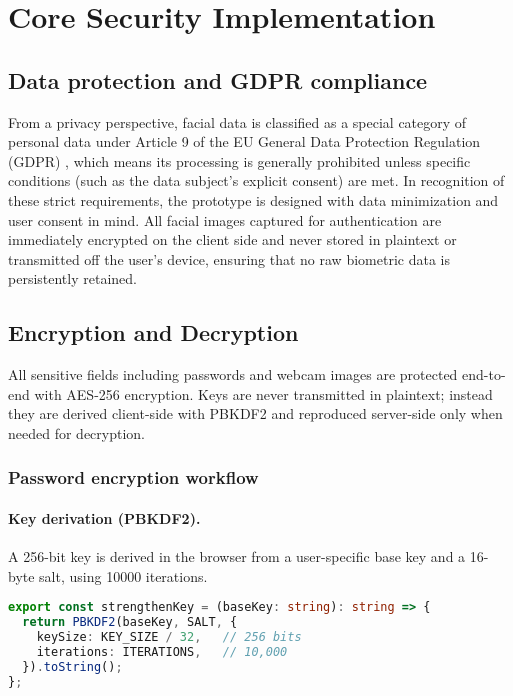 \section{Core Security Implementation}

\subsection{Data protection and GDPR compliance}
From a privacy perspective, facial data is classified as a special category of personal data under Article 9 of the EU General Data Protection Regulation (GDPR) \autocite{GDPR2016}, which means its processing is generally prohibited unless specific conditions (such as the data subject's explicit consent) are met. In recognition of these strict requirements, the prototype is designed with data minimization and user consent in mind. All facial images captured for authentication are immediately encrypted on the client side and never stored in plaintext or transmitted off the user's device, ensuring that no raw biometric data is persistently retained.

\subsection{Encryption and Decryption}\label{subsec:encryption}

All sensitive fields including passwords and webcam images are protected end-to-end with AES-256 encryption.
Keys are never transmitted in plaintext; instead they are derived client-side with PBKDF2 and reproduced server-side only when needed for decryption.

\subsubsection{Password encryption workflow}

\paragraph{Key derivation (PBKDF2).}
A 256-bit key is derived in the browser from a user-specific base key and a 16-byte salt, using 10000 iterations.

\begin{lstlisting}[language=TypeScript, caption={Key derivation function using PBKDF2}, label={lst:strengthen-key}]
export const strengthenKey = (baseKey: string): string => {
  return PBKDF2(baseKey, SALT, {
    keySize: KEY_SIZE / 32,   // 256 bits
    iterations: ITERATIONS,   // 10,000
  }).toString();
};
\end{lstlisting}

